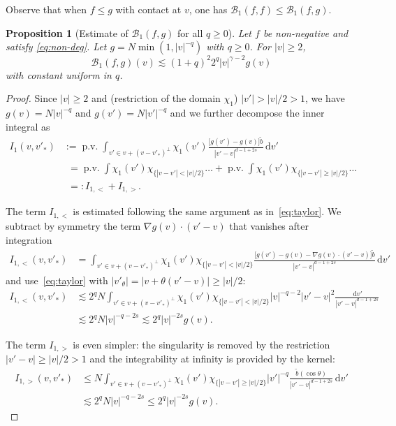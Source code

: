 \documentclass[JEP,XML,SOM,Unicode,NoFloatCountersInSection]{cedram}
\theoremstyle{plain}
\newtheorem{prop}[thm]{Proposition}
\theoremstyle{definition}
\numberwithin{equation}{section}
\newcommand{\dd} {\, \mathrm{d}}
\DeclareMathOperator{\PV}{p.v.}
\let\A N
\begin{document}
Observe that when $f \le g$ with contact at $v$, one has
$\mathcal{B}_1(f,f) \le \mathcal{B}_1(f,g)$.
\begin{prop}[Estimate of {$\mathcal{B}_1(f,g)$} for all $q \ge
0$] \label{prop:B1} Let $f$ be non-negative and satisfy \eqref{eq:non-deg}. Let
$g = \A \min(1,|v|^{-q})$ with $q \ge 0$. For $|v| \ge 2$,
\[ \mathcal{B}_1 (f,g)(v) \lesssim (1+q)^2 2^q |v|^{\gamma -2} g(v)\]
with constant uniform in $q$.
\end{prop}

\begin{proof}
Since $|v|\ge 2$ and (restriction of the domain $\chi_1$)
$|v'| > |v|/2 >1$, we have $g(v) = N |v|^{-q}$ and
$g(v') = N |v'|^{-q}$ and we further decompose the inner integral as
\begin{align*}
I_1(v,v'_*) &:= \PV \int_{v' \in v + (v-v'_*)^\bot} \chi_1
(v') \frac{\big[
g(v')-g(v) \big] \tilde b}{|v'-v|^{d-1+2s}} \dd v' \\
&\phantom{:}= \PV \int \chi_1(v')
\chi_{\{|v-v'| < |v|/2\}} \dots + \PV \int \chi_1(v')
\chi_{\{|v-v'| \ge |v|/2\}} \dots \\
&\phantom{:}=: I_{1,<} + I_{1,>}.
\end{align*}

The term $I_{1,<}$ is estimated following the same argument as
in~\eqref{eq:taylor}. We subtract by symmetry the term
$\nabla g(v) \cdot (v'-v)$ that vanishes after integration
\begin{align*}
I_{1,<}(v,v'_*) & = \int_{v' \in v + (v-v'_*)^\bot} \chi_1
(v') \chi_{\{|v-v'| < |v|/2\}} \frac{\big[ g(v')-g(v) - \nabla g (v) \cdot (v'-v) \big]
\tilde b}{|v'-v|^{d-1+2s}} \dd v'
\end{align*}
and use~\eqref{eq:taylor} with $|v'_\theta| = |v+\theta (v'-v)| \ge |v|/2$:
\begin{align*}
I_{1,<}(v,v'_*) & \lesssim 2^q \A \int_{v' \in v + (v-v'_*)^\bot}
\chi_1(v') \chi_{\{|v-v'| < |v|/2\}} |v|^{-q-2} |v'-v|^2 \frac{\dd v'}{|v'-v|^{d-1+2s}}\\
& \lesssim 2^q \A |v|^{-q-2s} \lesssim 2^q |v|^{-2s} g(v).
\end{align*}

The term $I_{1,>}$ is even simpler: the singularity is removed by the
restriction $|v'-v| \ge |v|/2 >1$ and the integrability at infinity is
provided by the kernel:
\begin{align*}
I_{1,>}(v,v'_*) & \le \A \int_{v' \in v + (v-v'_*)^\bot} \chi_1(v') \chi_{\{|v-v'| \ge |v|/2\}}
|v'|^{-q} \frac{\tilde b(\cos \theta)}{|v'-v|^{d-1+2s}}
\dd v'\\
& \lesssim 2^q \A |v|^{-q-2s} \le 2^q |v|^{-2s} g(v).
\end{align*}


\end{proof}
\end{document}
